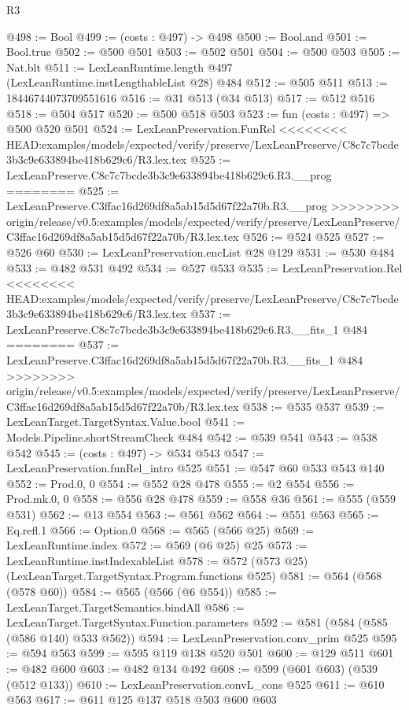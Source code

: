 \begin{lexlean}{R3}
\begin{coremodule}
{{{{{{{{{{{{{{{{{{{{{{{{{{@498 := Bool
@499 := (costs : @497) -> @498
@500 := Bool.and
@501 := Bool.true
@502 := @500 @501
@503 := @502 @501
@504 := @500 @503
@505 := Nat.blt
@511 := LexLeanRuntime.length @497 (LexLeanRuntime.instLengthableList @28) @484
@512 := @505 @511
@513 := 18446744073709551616
@516 := @31 @513 (@34 @513)
@517 := @512 @516
@518 := @504 @517
@520 := @500 @518 @503
@523 := fun (costs : @497) => @500 @520 @501
@524 := LexLeanPreservation.FunRel
<<<<<<<< HEAD:examples/models/expected/verify/preserve/LexLeanPreserve/C8c7c7bcde3b3c9e633894be418b629c6/R3.lex.tex
@525 := LexLeanPreserve.C8c7c7bcde3b3c9e633894be418b629c6.R3.__prog
========
@525 := LexLeanPreserve.C3ffac16d269df8a5ab15d5d67f22a70b.R3.__prog
>>>>>>>> origin/release/v0.5:examples/models/expected/verify/preserve/LexLeanPreserve/C3ffac16d269df8a5ab15d5d67f22a70b/R3.lex.tex
@526 := @524 @525
@527 := @526 @60
@530 := LexLeanPreservation.encList @28 @129
@531 := @530 @484
@533 := @482 @531 @492
@534 := @527 @533
@535 := LexLeanPreservation.Rel
<<<<<<<< HEAD:examples/models/expected/verify/preserve/LexLeanPreserve/C8c7c7bcde3b3c9e633894be418b629c6/R3.lex.tex
@537 := LexLeanPreserve.C8c7c7bcde3b3c9e633894be418b629c6.R3.__fits_1 @484
========
@537 := LexLeanPreserve.C3ffac16d269df8a5ab15d5d67f22a70b.R3.__fits_1 @484
>>>>>>>> origin/release/v0.5:examples/models/expected/verify/preserve/LexLeanPreserve/C3ffac16d269df8a5ab15d5d67f22a70b/R3.lex.tex
@538 := @535 @537
@539 := LexLeanTarget.TargetSyntax.Value.bool
@541 := Models.Pipeline.shortStreamCheck @484
@542 := @539 @541
@543 := @538 @542
@545 := (costs : @497) -> @534 @543
@547 := LexLeanPreservation.funRel_intro @525
@551 := @547 @60 @533 @543 @140
@552 := Prod.{0, 0}
@554 := @552 @28 @478
@555 := @2 @554
@556 := Prod.mk.{0, 0}
@558 := @556 @28 @478
@559 := @558 @36
@561 := @555 (@559 @531)
@562 := @13 @554
@563 := @561 @562
@564 := @551 @563
@565 := Eq.refl.{1}
@566 := Option.{0}
@568 := @565 (@566 @25)
@569 := LexLeanRuntime.index
@572 := @569 (@6 @25) @25
@573 := LexLeanRuntime.instIndexableList
@578 := @572 (@573 @25) (LexLeanTarget.TargetSyntax.Program.functions @525)
@581 := @564 (@568 (@578 @60))
@584 := @565 (@566 (@6 @554))
@585 := LexLeanTarget.TargetSemantics.bindAll
@586 := LexLeanTarget.TargetSyntax.Function.parameters
@592 := @581 (@584 (@585 (@586 @140) @533 @562))
@594 := LexLeanPreservation.conv_prim @525
@595 := @594 @563
@599 := @595 @119 @138 @520 @501
@600 := @129 @511
@601 := @482 @600
@603 := @482 @134 @492
@608 := @599 (@601 @603) (@539 (@512 @133))
@610 := LexLeanPreservation.convL_cons @525
@611 := @610 @563
@617 := @611 @125 @137 @518 @503 @600 @603
}}}}}}}}}}}}}}}}}}}}}}}}}}
\end{coremodule}
\end{lexlean}
